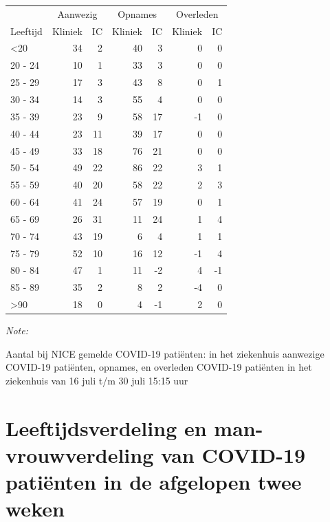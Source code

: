 \documentclass[
  english,
  man,floatsintext]{apa6}
\begin{document}
\begin{table}
\centering\begingroup\fontsize{10}{12}\selectfont

\begin{threeparttable}
\begin{tabular}{lrrrrrr}
\toprule
\multicolumn{1}{c}{ } & \multicolumn{2}{c}{Aanwezig} & \multicolumn{2}{c}{Opnames} & \multicolumn{2}{c}{Overleden} \\
\cmidrule(l{3pt}r{3pt}){2-3} \cmidrule(l{3pt}r{3pt}){4-5} \cmidrule(l{3pt}r{3pt}){6-7}
Leeftijd & Kliniek & IC & Kliniek & IC & Kliniek & IC\\
\midrule
<20 & 34 & 2 & 40 & 3 & 0 & 0\\
20 - 24 & 10 & 1 & 33 & 3 & 0 & 0\\
25 - 29 & 17 & 3 & 43 & 8 & 0 & 1\\
30 - 34 & 14 & 3 & 55 & 4 & 0 & 0\\
35 - 39 & 23 & 9 & 58 & 17 & -1 & 0\\
40 - 44 & 23 & 11 & 39 & 17 & 0 & 0\\
45 - 49 & 33 & 18 & 76 & 21 & 0 & 0\\
50 - 54 & 49 & 22 & 86 & 22 & 3 & 1\\
55 - 59 & 40 & 20 & 58 & 22 & 2 & 3\\
60 - 64 & 41 & 24 & 57 & 19 & 0 & 1\\
65 - 69 & 26 & 31 & 11 & 24 & 1 & 4\\
70 - 74 & 43 & 19 & 6 & 4 & 1 & 1\\
75 - 79 & 52 & 10 & 16 & 12 & -1 & 4\\
80 - 84 & 47 & 1 & 11 & -2 & 4 & -1\\
85 - 89 & 35 & 2 & 8 & 2 & -4 & 0\\
>90 & 18 & 0 & 4 & -1 & 2 & 0\\
\bottomrule
\end{tabular}
\begin{tablenotes}
\item \textit{Note: } 
\item Aantal bij NICE gemelde COVID-19 patiënten: in het ziekenhuis aanwezige COVID-19 patiënten, opnames, en overleden COVID-19 patiënten in het ziekenhuis van 16 juli t/m 30 juli 15:15 uur
\end{tablenotes}
\end{threeparttable}
\endgroup{}
\end{table}

\newpage

\hypertarget{leeftijdsverdeling-en-man-vrouwverdeling-van-covid-19-patiuxebnten-in-de-afgelopen-twee-weken}{%
\section{Leeftijdsverdeling en man-vrouwverdeling van COVID-19 patiënten in de afgelopen twee weken}\label{leeftijdsverdeling-en-man-vrouwverdeling-van-covid-19-patiuxebnten-in-de-afgelopen-twee-weken}}
\end{document}
